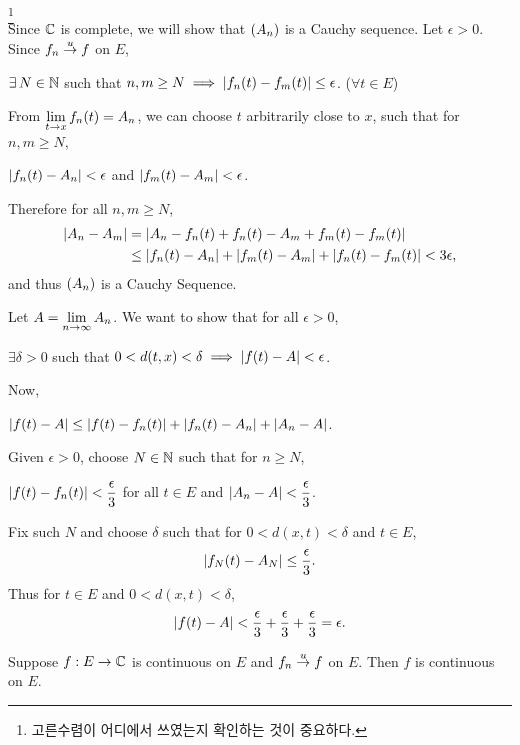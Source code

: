 \pf\footnote{고른수렴이 어디에서 쓰였는지 확인하는 것이 중요하다.}\\
 Since \(\mathbb{C}\) is complete, we will show that \(\left( A_n \right)\) is a Cauchy sequence. Let \(\epsilon > 0\). Since \(f_n \overset{u}{\rightarrow} f\) on \(E\),
\begin{center}
    \(\exists N \in \N\) such that \(n, m\geq N \implies \left| f_n(t) - f_m(t) \right| \leq \epsilon\). (\(\forall t\in E\))
\end{center}
From \(\displaystyle \lim_{t \rightarrow x} f_n(t) = A_n\), we can choose \(t\) arbitrarily close to \(x\), such that for \(n, m \geq N\),
\begin{center}
    \(\left| f_n(t) - A_n \right| < \epsilon\) and \(\left| f_m(t) - A_m \right| < \epsilon\).
\end{center}
Therefore for all \(n, m \geq N\),
\[
    \begin{aligned}
        \left| A_n - A_m \right| & = \left| A_n - f_n(t) + f_n(t) - A_m + f_m(t) - f_m(t) \right|                             \\
                        & \leq \left| f_n(t) - A_n \right| + \left| f_m(t) - A_m \right| + \left| f_n(t) - f_m(t) \right| < 3\epsilon,
    \end{aligned}
\]
and thus \(\left( A_n \right)\) is a Cauchy Sequence.

 Let \(A = \displaystyle \lim_{n \rightarrow \infty} A_n\). We want to show that for all \(\epsilon > 0\),
\begin{center}
    \(\exists \delta > 0\) such that \(0 < d(t, x) < \delta \implies \left| f(t) - A \right| < \epsilon\).
\end{center}
Now,
\begin{center}
    \(\displaystyle \left| f(t) - A \right| \leq \left| f(t) - f_n(t) \right| + \left| f_n(t) - A_n \right| + \left| A_n - A \right|\).
\end{center}
Given \(\epsilon > 0\), choose \(N \in \mathbb{N}\) such that for \(n \geq N\),
\begin{center}
    \(\displaystyle\left| f(t) - f_n(t) \right| < \frac{\epsilon}{3}\) for all \(t \in E\) and \(\displaystyle \left| A_n - A \right| < \frac{\epsilon}{3}\).
\end{center}
Fix such \(N\) and choose \(\delta\) such that for \(0 < d(x, t) < \delta\) and \(t \in E\),
\[
    \left| f_N(t) - A_N \right| \leq\frac{\epsilon}{3}.
\]
Thus for \(t\in E\) and \(0 < d(x, t) < \delta\),
\[
    \left| f(t) - A \right| < \frac{\epsilon}{3} + \frac{\epsilon}{3} + \frac{\epsilon}{3} = \epsilon.
\]

 Suppose \(f: E \rightarrow \mathbb{C}\) is continuous on \(E\) and \(f_n \overset{u}{\rightarrow} f\) on \(E\). Then \(f\) is continuous on \(E\).

